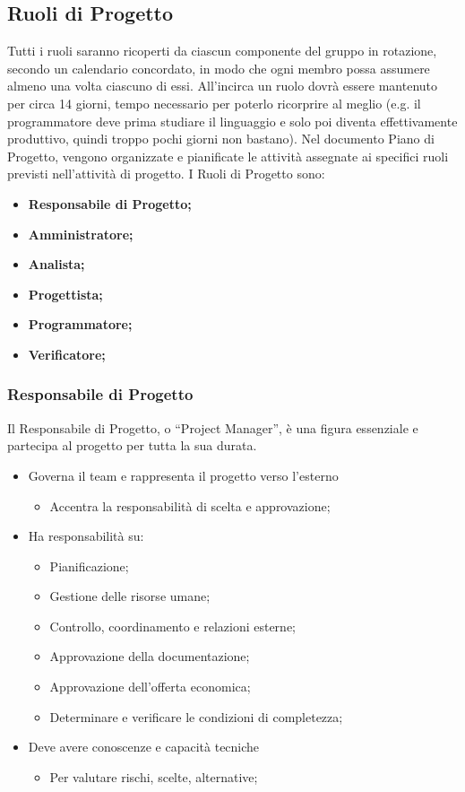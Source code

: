 \subsection{Ruoli di Progetto}
Tutti i ruoli saranno ricoperti da ciascun componente del gruppo in rotazione, secondo un calendario concordato, in modo che ogni membro possa assumere almeno una volta ciascuno di essi. All'incirca un ruolo dovrà essere mantenuto per circa 14 giorni, tempo necessario per poterlo ricorprire al meglio (e.g. il programmatore deve prima studiare il linguaggio e solo poi diventa effettivamente produttivo, quindi troppo pochi giorni non bastano).
Nel documento Piano di Progetto, vengono organizzate e pianificate le attività assegnate ai specifici ruoli previsti nell’attività di progetto. I Ruoli di Progetto sono:
\begin{itemize}
\item{\textbf{Responsabile di Progetto;}}
\item{\textbf{Amministratore;}}
\item{\textbf{Analista;}}
\item{\textbf{Progettista;}}
\item{\textbf{Programmatore;}}
\item{\textbf{Verificatore;}}
\end{itemize}

\subsubsection{Responsabile di Progetto}
Il Responsabile di Progetto,  o  “Project  Manager”,  è una figura essenziale e partecipa al  progetto per tutta la sua durata.  
\begin{itemize}
\item{Governa il team e rappresenta il progetto verso l'esterno}
	\begin{itemize}
	\item{Accentra la responsabilità di scelta e approvazione;}
	\end{itemize}
\item{Ha responsabilità su:}
	\begin{itemize}
	\item{Pianificazione;}
	\item{Gestione delle risorse umane;}
	\item{Controllo, coordinamento e relazioni esterne;}
	\item{Approvazione della documentazione;}
	\item{Approvazione dell’offerta economica;}
	\item{Determinare e verificare le condizioni di completezza;}
	\end{itemize}
\item{Deve avere conoscenze e capacità tecniche}
	\begin{itemize}
	\item{Per valutare rischi, scelte, alternative;}
	\end{itemize}
\end{itemize}

